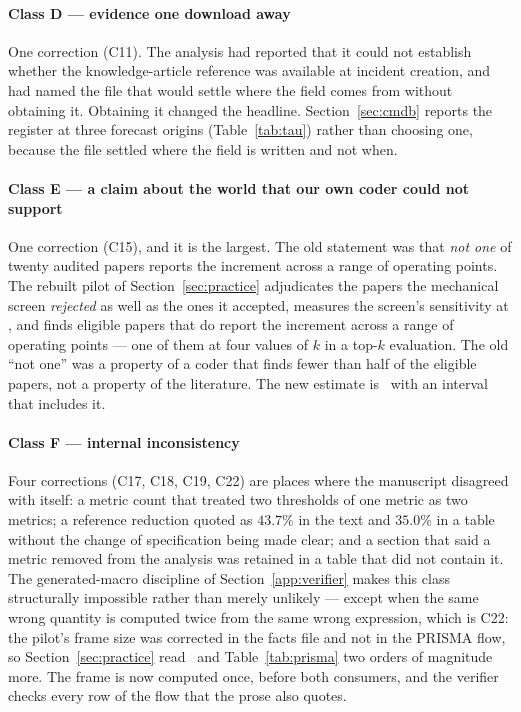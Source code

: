 \paragraph{Class D --- evidence one download away}
One correction (C11). The analysis had reported that it could not establish
whether the knowledge-article reference was available at incident creation,
and had named the file that would settle where the field comes from without
obtaining it. Obtaining it changed the headline. Section~\ref{sec:cmdb}
reports the register at three forecast origins (Table~\ref{tab:tau}) rather
than choosing one, because the file settled where the field is written and
not when.

\paragraph{Class E --- a claim about the world that our own coder could not
support}
One correction (C15), and it is the largest. The old statement was that
\emph{not one} of twenty audited papers reports the increment across a range
of operating points. The rebuilt pilot of Section~\ref{sec:practice}
adjudicates the papers the mechanical screen \emph{rejected} as well as the
ones it accepted, measures the screen's sensitivity at \auditSens, and finds
eligible papers that do report the increment across a range of operating
points --- one of them at four values of $k$ in a top-$k$ evaluation. The old
``not one'' was a property of a coder that finds fewer than half of the
eligible papers, not a property of the literature. The new estimate is
\auditRangeThresholdPct\ with an interval that includes it.

\paragraph{Class F --- internal inconsistency}
Four corrections (C17, C18, C19, C22) are places where the manuscript
disagreed with itself: a metric count that treated two thresholds of one
metric as two metrics; a reference reduction quoted as
$43.7\%$ in the text and $35.0\%$ in a table without the change of
specification being made clear; and a section that said a metric
removed from the analysis was retained in a table that did not contain it.
The generated-macro discipline of Section~\ref{app:verifier} makes this class
structurally impossible rather than merely unlikely --- except when the same
wrong quantity is computed twice from the same wrong expression, which is
C22: the pilot's frame size was corrected in the facts file and not in the
PRISMA flow, so Section~\ref{sec:practice} read \nAuditFrame\ and
Table~\ref{tab:prisma} two orders of magnitude more. The frame is now
computed once, before both consumers, and the verifier checks every row of
the flow that the prose also quotes.

